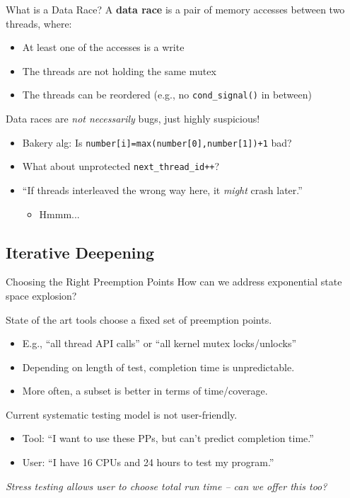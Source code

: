 \documentclass[xcolor=dvipsnames]{beamer}
\begin{document}
\begin{frame}{What is a Data Race?}
	A {\bf data race} is a pair of memory accesses between two threads, where:
	\begin{itemize}
		\item At least one of the accesses is a write
		\item The threads are not holding the same mutex
		\item The threads can be reordered (e.g., no \texttt{cond\_signal()} in between)
	\end{itemize}
	\pause
	\linegap

	Data races are {\em not necessarily} bugs, just highly suspicious!
	\begin{itemize}
		\item Bakery alg: Is {\tt number[i]=max(number[0],number[1])+1} bad?
		\item What about unprotected {\tt next\_thread\_id++}?
		\item ``If threads interleaved the wrong way here, it {\em might} crash later.''
		\begin{itemize}
			\item Hmmm...
		\end{itemize}
	\end{itemize}
\end{frame}


\subsection{Iterative Deepening}

\begin{frame}{Choosing the Right Preemption Points}
	How can we address exponential state space explosion?
	\pause
	\linegap

	State of the art tools choose a fixed set of preemption points.
	\begin{itemize}
		\item E.g., ``all thread API calls'' or ``all kernel mutex locks/unlocks''
		\item Depending on length of test, completion time is unpredictable.
		\item More often, a subset is better in terms of time/coverage.
	\end{itemize}
	\pause
	\linegap
	Current systematic testing model is not user-friendly.
	\begin{itemize}
		\item Tool: ``I want to use these PPs, but can't predict completion time.''
		\item User: ``I have 16 CPUs and 24 hours to test my program.''
	\end{itemize}
	\linegap
	{\em Stress testing allows user to choose total run time -- can we offer this too?}
\end{frame}
\end{document}
